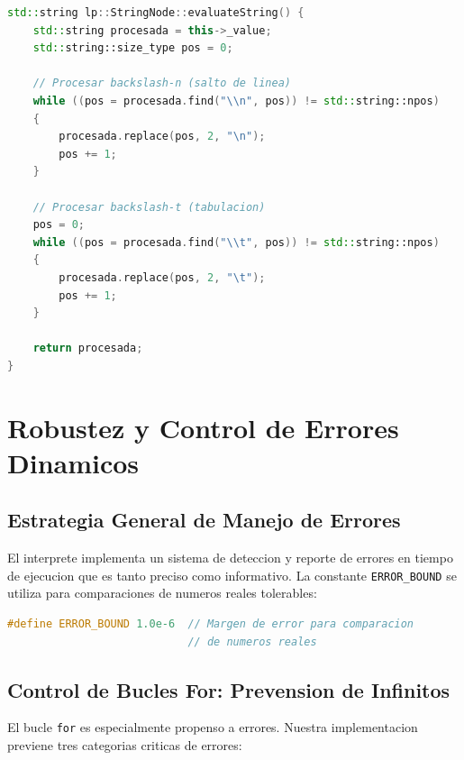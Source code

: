 \documentclass[11pt,a4paper]{article}
\begin{document}
\begin{lstlisting}[language=C++, caption={Procesamiento de escape en StringNode}]
std::string lp::StringNode::evaluateString() {
    std::string procesada = this->_value;
    std::string::size_type pos = 0;

    // Procesar backslash-n (salto de linea)
    while ((pos = procesada.find("\\n", pos)) != std::string::npos) 
    {
        procesada.replace(pos, 2, "\n");
        pos += 1;
    }

    // Procesar backslash-t (tabulacion)
    pos = 0;
    while ((pos = procesada.find("\\t", pos)) != std::string::npos) 
    {
        procesada.replace(pos, 2, "\t");
        pos += 1;
    }

    return procesada;
}
\end{lstlisting}

\newpage

\section{Robustez y Control de Errores Dinamicos}

\subsection{Estrategia General de Manejo de Errores}

El interprete implementa un sistema de deteccion y reporte de errores en tiempo de ejecucion que es tanto preciso como informativo. La constante \texttt{ERROR\_BOUND} se utiliza para comparaciones de numeros reales tolerables:

\begin{lstlisting}[language=C++, caption={Definicion de margen de error}]
#define ERROR_BOUND 1.0e-6  // Margen de error para comparacion
                            // de numeros reales
\end{lstlisting}

\subsection{Control de Bucles For: Prevension de Infinitos}

El bucle \texttt{for} es especialmente propenso a errores. Nuestra implementacion previene tres categorias criticas de errores:
\end{document}

